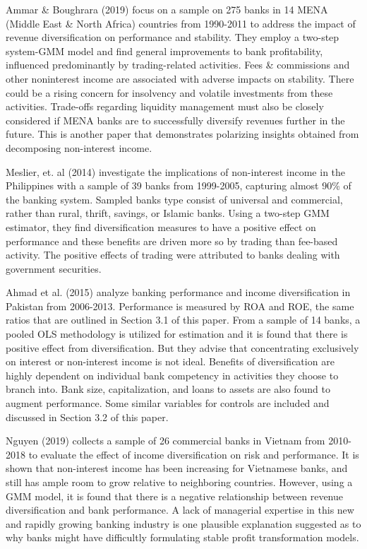 \documentclass[10pt]{article} %
\begin{document}
Ammar \& Boughrara (2019) focus on a sample on 275 banks in 14 MENA (Middle East \& North Africa) countries from 1990-2011 to address the impact of revenue diversification on performance and stability. They employ a two-step system-GMM model and find general improvements to bank profitability, influenced predominantly by trading-related activities. Fees \& commissions and other noninterest income are associated with adverse impacts on stability. There could be a rising concern for insolvency and volatile investments from these activities. Trade-offs regarding liquidity management must also be closely considered if MENA banks are to successfully diversify revenues further in the future. This is another paper that demonstrates polarizing insights obtained from decomposing non-interest income. 

Meslier, et. al (2014) investigate the implications of non-interest income in the Philippines with a sample of 39 banks from 1999-2005, capturing almost 90\% of the banking system. Sampled banks type consist of universal and commercial, rather than rural, thrift, savings, or Islamic banks. Using a two-step GMM estimator, they find diversification measures to have a positive effect on performance and these benefits are driven more so by trading than fee-based activity. The positive effects of trading were attributed to banks dealing with government securities. 

Ahmad et al. (2015) analyze banking performance and income diversification in Pakistan from 2006-2013. Performance is measured by ROA and ROE, the same ratios that are outlined in Section 3.1 of this paper. From a sample of 14 banks, a pooled OLS methodology is utilized for estimation and it is found that there is positive effect from diversification. But they advise that concentrating exclusively on interest or non-interest income is not ideal. Benefits of diversification are highly dependent on individual bank competency in activities they choose to branch into. Bank size, capitalization, and loans to assets are also found to augment performance. Some similar variables for controls are included and discussed in Section 3.2 of this paper. 

Nguyen (2019) collects a sample of 26 commercial banks in Vietnam from 2010-2018 to evaluate the effect of income diversification on risk and performance. It is shown that non-interest income has been increasing for Vietnamese banks, and still has ample room to grow relative to neighboring countries. However, using a GMM model, it is found that there is a negative relationship between revenue diversification and bank performance. A lack of managerial expertise in this new and rapidly growing banking industry is one plausible explanation suggested as to why banks might have difficultly formulating stable profit transformation models. 
\end{document}
